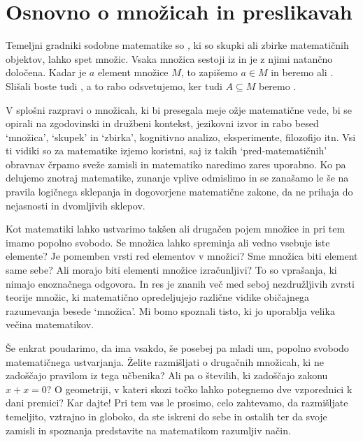 \chapter{Osnovno o množicah in preslikavah}
\label{cha:mnozice-in-preslikave}


Temeljni gradniki sodobne matematike so , ki so skupki ali zbirke matematičnih
objektov, lahko spet množic. Vsaka množica sestoji iz  in je z njimi
natančno določena.
%
Kadar je $a$ element množice $M$, to zapišemo $a \in M$ in beremo  ali .
%
Slišali boste tudi , a to rabo odsvetujemo, ker tudi $A \subseteq M$ beremo .

V splošni razpravi o množicah, ki bi presegala meje ožje matematične vede, bi se opirali na
zgodovinski in družbeni kontekst, jezikovni izvor in rabo besed `množica', `skupek' in
`zbirka', kognitivno analizo, eksperimente, filozofijo itn. Vsi ti vidiki so za matematike
izjemo koristni, saj iz takih `pred-matematičnih' obravnav črpamo sveže zamisli in
matematiko naredimo zares uporabno. Ko pa delujemo znotraj matematike, zunanje vplive
odmislimo in se zanašamo le še na pravila logičnega sklepanja in dogovorjene matematične zakone, da ne
prihaja do nejasnosti in dvomljivih sklepov.

Kot matematiki lahko ustvarimo takšen ali drugačen pojem množice in pri tem imamo popolno
svobodo. Se množica lahko spreminja ali vedno vsebuje iste elemente? Je pomemben vrsti red
elementov v množici? Sme množica biti element same sebe? Ali morajo biti elementi množice
izračunljivi? To so vprašanja, ki nimajo enoznačnega odgovora. In res je znanih več med
seboj nezdružljivih zvrsti teorije množic, ki matematično opredeljujejo različne vidike
običajnega razumevanja besede `množica'. Mi bomo spoznali tisto, ki jo uporablja velika večina matematikov.

Še enkrat poudarimo, da ima vsakdo, še posebej pa mladi um, popolno svobodo matematičnega
ustvarjanja. Želite razmišljati o drugačnih množicah, ki ne zadoščajo pravilom iz tega učbenika?
Ali pa o številih, ki zadoščajo zakonu $x + x = 0$? O geometriji, v
kateri skozi točko lahko potegnemo dve vzporednici k dani premici? Kar dajte! Pri tem vas
le prosimo, celo zahtevamo, da razmišljate temeljito, vztrajno in globoko, da ste iskreni
do sebe in ostalih ter da svoje zamisli in spoznanja predstavite na matematikom razumljiv
način.



